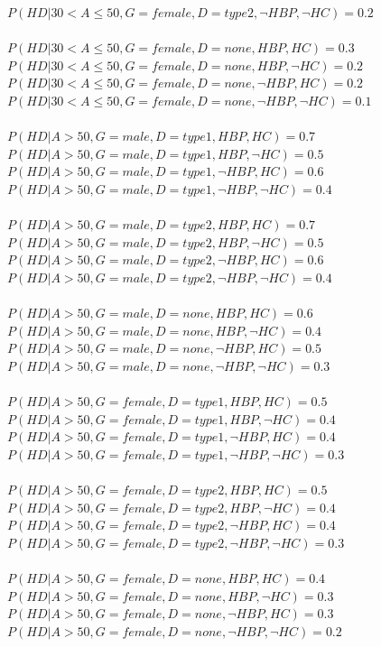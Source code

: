 \documentclass{article}
\begin{document}
$P(HD | 30 < A \leq 50, G = female, D = type2, \neg HBP, \neg HC) = 0.2$\\
\\
$P(HD | 30 < A \leq 50, G = female, D = none, HBP, HC) = 0.3 $\\
$P(HD | 30 < A \leq 50, G = female, D = none, HBP, \neg HC) = 0.2$\\
$P(HD | 30 < A \leq 50, G = female, D = none, \neg HBP, HC) = 0.2$\\
$P(HD | 30 < A \leq 50, G = female, D = none, \neg HBP, \neg HC) = 0.1$\\
\\
$P(HD | A > 50, G = male, D = type1, HBP, HC) = 0.7 $\\
$P(HD | A > 50, G = male, D = type1, HBP, \neg HC) = 0.5$\\
$P(HD | A > 50, G = male, D = type1, \neg HBP, HC) = 0.6$\\
$P(HD | A > 50, G = male, D = type1, \neg HBP, \neg HC) = 0.4$\\
\\
$P(HD | A > 50, G = male, D = type2, HBP, HC) = 0.7$\\
$P(HD | A > 50, G = male, D = type2, HBP, \neg HC) = 0.5$\\
$P(HD | A > 50, G = male, D = type2, \neg HBP, HC) = 0.6$\\
$P(HD | A > 50, G = male, D = type2, \neg HBP, \neg HC) = 0.4$\\
\\
$P(HD | A > 50, G = male, D = none, HBP, HC) = 0.6 $\\
$P(HD | A > 50, G = male, D = none, HBP, \neg HC) = 0.4$\\
$P(HD | A > 50, G = male, D = none, \neg HBP, HC) = 0.5$\\
$P(HD | A > 50, G = male, D = none, \neg HBP, \neg HC) = 0.3$\\
\\
$P(HD | A > 50, G = female, D = type1, HBP, HC) = 0.5 $\\
$P(HD | A > 50, G = female, D = type1, HBP, \neg HC) = 0.4$\\
$P(HD | A > 50, G = female, D = type1, \neg HBP, HC) = 0.4$\\
$P(HD | A > 50, G = female, D = type1, \neg HBP, \neg HC) = 0.3$\\
\\
$P(HD | A > 50, G = female, D = type2, HBP, HC) = 0.5 $\\
$P(HD | A > 50, G = female, D = type2, HBP, \neg HC) = 0.4$\\
$P(HD | A > 50, G = female, D = type2, \neg HBP, HC) = 0.4$\\
$P(HD | A > 50, G = female, D = type2, \neg HBP, \neg HC) = 0.3$\\
\\
$P(HD | A > 50, G = female, D = none, HBP, HC) = 0.4$\\
$P(HD | A > 50, G = female, D = none, HBP, \neg HC) = 0.3$\\
$P(HD | A > 50, G = female, D = none, \neg HBP, HC) = 0.3$\\
$P(HD | A > 50, G = female, D = none, \neg HBP, \neg HC) = 0.2$
\end{document}
